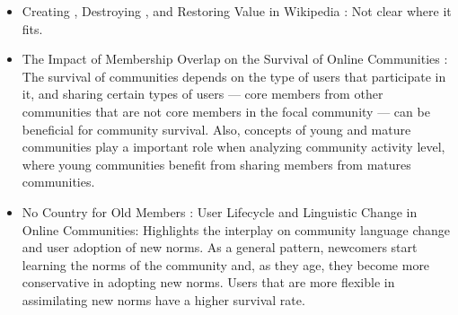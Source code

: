 \begin{itemize}
    \item Creating , Destroying , and Restoring Value in Wikipedia \cite{Priedhorsky2007}: Not clear where it fits.

    \item The Impact of Membership Overlap on the Survival of Online Communities \cite{Zhu2014}: The survival of communities depends on the type of users that participate in it, and sharing certain types of users --- core members from other communities that are not core members in the focal community --- can be beneficial for community survival. Also, concepts of young and mature communities play a important role when analyzing community activity level, where young communities benefit from sharing members from matures communities. 

    \item No Country for Old Members : User Lifecycle and Linguistic Change in Online Communities: Highlights the interplay on community language change and user adoption of new norms. As a general pattern, newcomers start learning the norms of the community and, as they age, they become more conservative in adopting new norms. Users that are more flexible in assimilating new norms have a higher survival rate.
    
\end{itemize}

